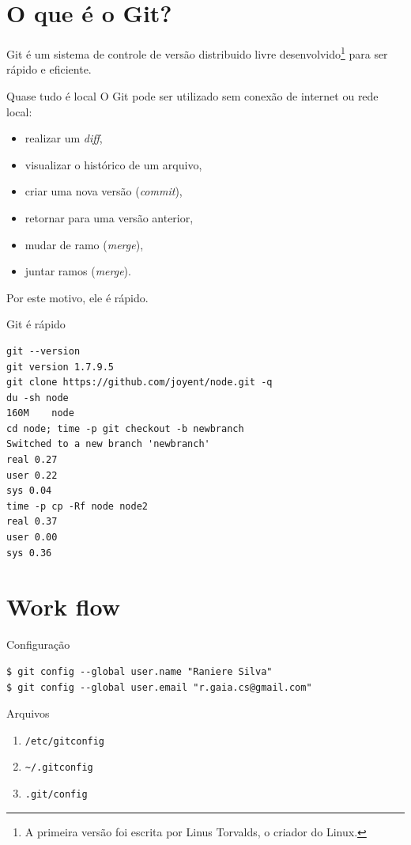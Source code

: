 \documentclass[11pt]{beamer}
\begin{document}
\begin{frame}
    \tableofcontents
\end{frame}

\section{O que é o Git?}
\begin{frame}
    Git é um sistema de controle de versão distribuido livre
    desenvolvido\footnote{A primeira versão foi escrita por Linus Torvalds, o
    criador do Linux.} para
    ser rápido e eficiente.
\end{frame}

\begin{frame}{Quase tudo é local}
    O Git pode ser utilizado sem conexão de internet ou rede local:
    \begin{itemize}
        \item realizar um \textit{diff}, \pause
        \item visualizar o histórico de um arquivo, \pause
        \item criar uma nova versão (\textit{commit}), \pause
        \item retornar para uma versão anterior, \pause
        \item mudar de ramo (\textit{merge}), \pause
        \item juntar ramos (\textit{merge}). \pause
    \end{itemize}

    Por este motivo, ele é rápido.
\end{frame}

\begin{frame}[fragile]{Git é rápido}
    \begin{lstlisting}
git --version
git version 1.7.9.5
git clone https://github.com/joyent/node.git -q
du -sh node
160M    node
cd node; time -p git checkout -b newbranch
Switched to a new branch 'newbranch'
real 0.27
user 0.22
sys 0.04
time -p cp -Rf node node2
real 0.37
user 0.00
sys 0.36
    \end{lstlisting}
\end{frame}

\section{Work flow}
\begin{frame}[fragile]{Configuração}
    \begin{lstlisting}
$ git config --global user.name "Raniere Silva"
$ git config --global user.email "r.gaia.cs@gmail.com"
    \end{lstlisting}

    \begin{block}{Arquivos}
        \begin{enumerate}
            \item  \lstinline+/etc/gitconfig+
            \item  \lstinline+~/.gitconfig+
            \item  \lstinline+.git/config+
        \end{enumerate}
    \end{block}
\end{frame}
\end{document}
